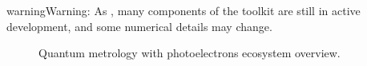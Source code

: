 \documentclass[letterpaper,table,10pt,english]{jupyterBook}
\begin{document}
\begin{sphinxShadowBox}
\sphinxstylesidebartitle{}

\begin{sphinxadmonition}{warning}{Warning:}
\sphinxAtStartPar
As {\hyperref[\detokenize{frontmatter/book_versions_note:sec-numerics-disclaimer}]{}}, many components of the toolkit are still in active development, and some numerical details may change.
\end{sphinxadmonition}
\end{sphinxShadowBox}

\begin{figure}[htbp]
\centering
\capstart

\noindent{}
\caption{Quantum metrology with photoelectrons ecosystem overview.}\label{\detokenize{part1/platform_intro_070723:qm-platform-diag}}\end{figure}
\end{document}
